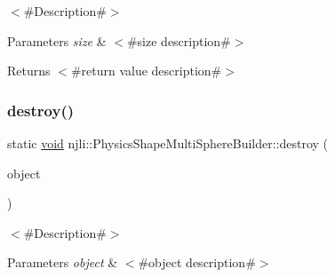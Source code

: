 $<$\#\+Description\#$>$


\begin{DoxyParams}{Parameters}
{\em size} & $<$\#size description\#$>$\\
\hline
\end{DoxyParams}
\begin{DoxyReturn}{Returns}
$<$\#return value description\#$>$ 
\end{DoxyReturn}
\mbox{\label{classnjli_1_1_physics_shape_multi_sphere_builder_a3f59fd995d271b2d7dfa469c8ec41ccb}} 
\subsubsection{\texorpdfstring{destroy()}{destroy()}}
{\footnotesize\ttfamily static \mbox{\hyperlink{_thread_8h_af1e856da2e658414cb2456cb6f7ebc66}{void}} njli\+::\+Physics\+Shape\+Multi\+Sphere\+Builder\+::destroy (\begin{DoxyParamCaption}\item[{\mbox{\hyperlink{classnjli_1_1_physics_shape_multi_sphere_builder}{Physics\+Shape\+Multi\+Sphere\+Builder}} $\ast$}]{object }\end{DoxyParamCaption})\hspace{0.3cm}{\ttfamily [static]}}

$<$\#\+Description\#$>$


\begin{DoxyParams}{Parameters}
{\em object} & $<$\#object description\#$>$ \\
\hline
\end{DoxyParams}
\mbox{\label{classnjli_1_1_physics_shape_multi_sphere_builder_a63c86d52b855bce35d47a4e5a14aa805}} 
